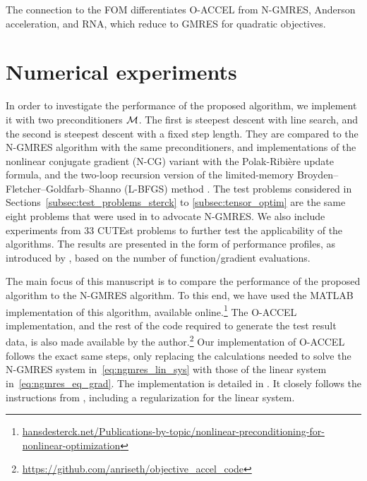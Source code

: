 \documentclass[main.tex]{subfiles}
\begin{document}
\begin{remark}
  The connection to the FOM differentiates O-ACCEL from N-GMRES,
  Anderson acceleration, and RNA, which reduce to GMRES for quadratic
  objectives.
\end{remark}


\section{Numerical experiments}\label{sec:num_experiments}
In order to investigate the performance of the proposed algorithm, we
implement it with two preconditioners $\mathcal{M}$. The first is steepest
descent with line search, and the second is steepest descent with a
fixed step length.  They are compared to the N-GMRES algorithm with
the same preconditioners, and implementations of the nonlinear
conjugate gradient (N-CG) variant with the Polak-Ribi\`{e}re update
formula, and the two-loop recursion version of the limited-memory
Broyden--Fletcher--Goldfarb--Shanno (L-BFGS) method
\citep{nocedal2006numerical}.  The test problems considered in
Sections~\ref{subsec:test_problems_sterck} to
\ref{subsec:tensor_optim} are the same eight problems that were used
in \citet{sterck2013steepest} to advocate N-GMRES. We also include
experiments from \num{33} CUTEst problems to further test the
applicability of the algorithms.  The results are presented in the
form of performance profiles, as introduced by
\citet{dolan2002benchmarking}, based on the number of
function/gradient evaluations.

The main focus of this manuscript is to compare the performance of the
proposed algorithm to the N-GMRES algorithm. To this end, we have used
the MATLAB implementation of this algorithm, available
online.\footnote{\href{http://www.hansdesterck.net/Publications-by-topic/nonlinear-preconditioning-for-nonlinear-optimization}
  {hansdesterck.net/Publications-by-topic/nonlinear-preconditioning-for-nonlinear-optimization}}
The O-ACCEL implementation, and the rest of the code required to
generate the test result data, is also made available by the
author.\footnote{\url{https://github.com/anriseth/objective_accel_code}}
Our implementation of O-ACCEL follows the exact same steps, only
replacing the calculations needed to solve the N-GMRES system
in~\eqref{eq:ngmres_lin_sys} with those of the linear system
in~\eqref{eq:ngmres_eq_grad}.  The implementation is detailed in
. It closely follows the instructions from
\citet{washio1997krylov}, including a regularization for the linear
system.
\end{document}
